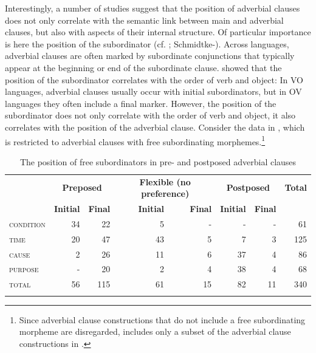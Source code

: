 \documentclass[output=paper]{langsci/langscibook}
\begin{document}
Interestingly, a number of studies suggest that the position of adverbial clauses does not only correlate with the semantic link between main and adverbial clauses, but also with aspects of their internal structure. Of particular importance is here the position of the subordinator (cf. \citealt{Diessel2001}; Schmidtke-\citealt{Bode2009,Hetterle2015}). Across languages, adverbial clauses are often marked by subordinate conjunctions that typically appear at the beginning or end of the subordinate clause. \citet{Dryer1992} showed that the position of the subordinator correlates with the order of verb and object: In VO languages, adverbial clauses usually occur with initial subordinators, but in OV languages they often include a final marker. However, the position of the subordinator does not only correlate with the order of verb and object, it also correlates with the position of the adverbial clause. Consider the data in , which is restricted to adverbial clauses with free subordinating morphemes.\footnote{Since adverbial clause constructions that do not include a free subordinating morpheme are disregarded,  includes only a subset of the adverbial clause constructions in .} 

\begin{table}
\begin{tabularx}{\textwidth}{Xrrrrrrr}
\lsptoprule
& \multicolumn{2}{c}{\bfseries Preposed} & \multicolumn{2}{c}{\bfseries Flexible (no preference)} & \multicolumn{2}{c}{\bfseries Postposed} & \bfseries Total\\
& \bfseries Initial & \bfseries Final & \bfseries Initial & \bfseries Final & \bfseries Initial & \bfseries Final & \\
\textsc{condition} & 34 & 22 & 5 & - & - & - & 61\\
\textsc{time} & 20 & 47 & 43 & 5 & 7 & 3 & 125\\
\textsc{cause} & 2 & 26 & 11 & 6 & 37 & 4 & 86\\
\textsc{purpose} & - & 20 & 2 & 4 & 38 & 4 & 68\\
\textsc{total} & 56 & 115 & 61 & 15 & 82 & 11 & 340\\
\lspbottomrule
\end{tabularx}

\caption{The position of free subordinators in pre- and postposed adverbial clauses}
\label{tab:diessel:3}
\end{table}
\end{document}
